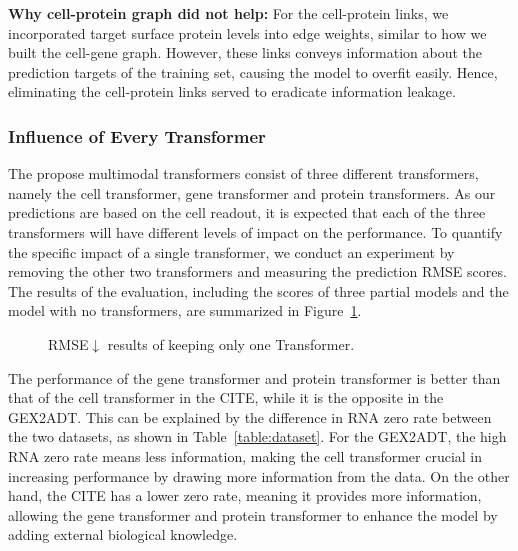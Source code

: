 \noindent \textbf{Why cell-protein graph did not help:} For the cell-protein links, we incorporated target surface protein levels into edge weights, similar to how we built the cell-gene graph. However, these links conveys information about the prediction targets of the training set, causing the model to overfit easily. Hence, eliminating the cell-protein links served to eradicate information leakage.

\subsubsection{Influence of Every Transformer} The propose multimodal transformers consist of three different transformers, namely the cell transformer, gene transformer and protein transformers. As our predictions are based on the cell readout, it is expected that each of the three transformers will have different levels of impact on the performance. To quantify the specific impact of a single transformer, we conduct an experiment by removing the other two transformers and measuring the prediction RMSE scores. The results of the evaluation, including the scores of three partial models and the model with no transformers, are summarized in 
Figure~\ref{fig:one_trans}.
% 
\begin{figure}[htb]%
    \vspace{-2.em}
    \centering
    \caption{RMSE$\downarrow$ results of keeping only one Transformer.}%
    \vspace{-1.2em}
    \label{fig:one_trans}%
    \vspace{-1.8em}
\end{figure}

The performance of the gene transformer and protein transformer is better than that of the cell transformer in the CITE, while it is the opposite in the GEX2ADT. This can be explained by the difference in RNA zero rate between the two datasets, as shown in Table~\ref{table:dataset}. For the GEX2ADT, the high RNA zero rate means less information, making the cell transformer crucial in increasing performance by drawing more information from the data. On the other hand, the CITE has a lower zero rate, meaning it provides more information, allowing the gene transformer and protein transformer to enhance the model by adding external biological knowledge.

